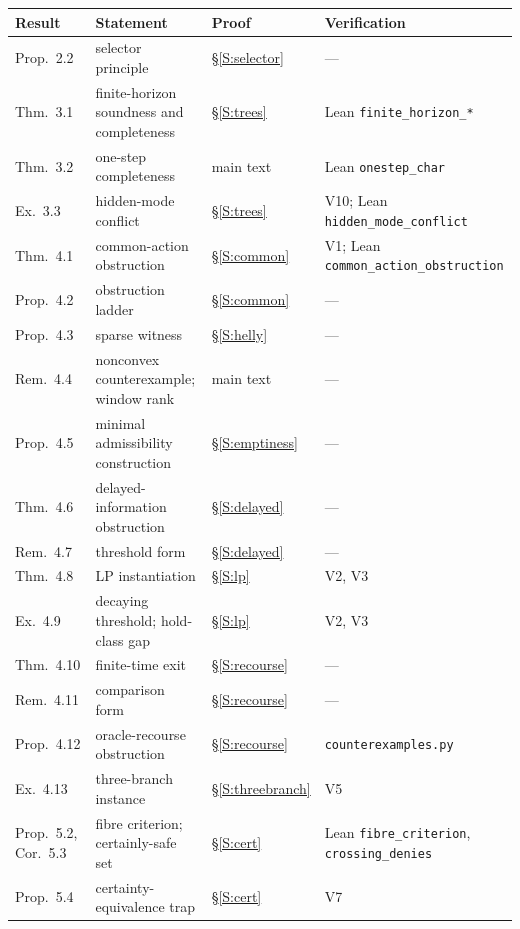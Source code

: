 \documentclass[11pt,a4paper]{article}
\theoremstyle{plain}
\theoremstyle{definition}
\theoremstyle{remark}
\begin{document}
\begin{table}[htbp]
\centering\small
\begin{tabularx}{\textwidth}{@{}>{\raggedright\arraybackslash}p{}>{\raggedright\arraybackslash}X>{\raggedright\arraybackslash}p{}>{\raggedright\arraybackslash}p{}@{}}
\toprule
Result & Statement & Proof & Verification\\
\midrule
Prop.~2.2 & selector principle & \S\ref{S:selector} & ---\\
Thm.~3.1 & finite-horizon soundness and completeness & \S\ref{S:trees} & Lean \texttt{finite\_horizon\_*}\\
Thm.~3.2 & one-step completeness & main text & Lean \texttt{onestep\_char}\\
Ex.~3.3 & hidden-mode conflict & \S\ref{S:trees} & V10; Lean \texttt{hidden\_mode\_conflict}\\
Thm.~4.1 & common-action obstruction & \S\ref{S:common} & V1; Lean \texttt{common\_action\_obstruction}\\
Prop.~4.2 & obstruction ladder & \S\ref{S:common} & ---\\
Prop.~4.3 & sparse witness & \S\ref{S:helly} & ---\\
Rem.~4.4 & nonconvex counterexample; window rank & main text & ---\\
Prop.~4.5 & minimal admissibility construction & \S\ref{S:emptiness} & ---\\
Thm.~4.6 & delayed-information obstruction & \S\ref{S:delayed} & ---\\
Rem.~4.7 & threshold form & \S\ref{S:delayed} & ---\\
Thm.~4.8 & LP instantiation & \S\ref{S:lp} & V2, V3\\
Ex.~4.9 & decaying threshold; hold-class gap & \S\ref{S:lp} & V2, V3\\
Thm.~4.10 & finite-time exit & \S\ref{S:recourse} & ---\\
Rem.~4.11 & comparison form & \S\ref{S:recourse} & ---\\
Prop.~4.12 & oracle-recourse obstruction & \S\ref{S:recourse} & \texttt{counterexamples.py}\\
Ex.~4.13 & three-branch instance & \S\ref{S:threebranch} & V5\\
Prop.~5.2, Cor.~5.3 & fibre criterion; certainly-safe set & \S\ref{S:cert} & Lean \texttt{fibre\_criterion}, \texttt{crossing\_denies}\\
Prop.~5.4 & certainty-equivalence trap & \S\ref{S:cert} & V7\\

\end{tabularx}
\end{table}
\end{document}
